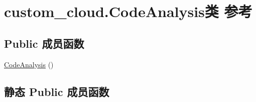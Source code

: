 \hypertarget{classcustom__cloud_1_1_code_analysis}{}\section{custom\+\_\+cloud.\+Code\+Analysis类 参考}
\label{classcustom__cloud_1_1_code_analysis}
\subsection*{Public 成员函数}
\begin{DoxyCompactItemize}
\item 
\hyperlink{classcustom__cloud_1_1_code_analysis_a870691a732e04a48279201333a10719e}{Code\+Analysis} ()
\end{DoxyCompactItemize}
\subsection*{静态 Public 成员函数}
